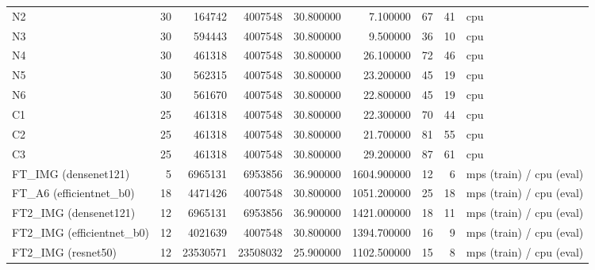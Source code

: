 \begin{table}
\begin{tabular}{lrrrrrrrl}
N2 & 30 & 164742 & 4007548 & 30.800000 & 7.100000 & 67 & 41 & cpu \\
N3 & 30 & 594443 & 4007548 & 30.800000 & 9.500000 & 36 & 10 & cpu \\
N4 & 30 & 461318 & 4007548 & 30.800000 & 26.100000 & 72 & 46 & cpu \\
N5 & 30 & 562315 & 4007548 & 30.800000 & 23.200000 & 45 & 19 & cpu \\
N6 & 30 & 561670 & 4007548 & 30.800000 & 22.800000 & 45 & 19 & cpu \\
C1 & 25 & 461318 & 4007548 & 30.800000 & 22.300000 & 70 & 44 & cpu \\
C2 & 25 & 461318 & 4007548 & 30.800000 & 21.700000 & 81 & 55 & cpu \\
C3 & 25 & 461318 & 4007548 & 30.800000 & 29.200000 & 87 & 61 & cpu \\
FT\_IMG (densenet121) & 5 & 6965131 & 6953856 & 36.900000 & 1604.900000 & 12 & 6 & mps (train) / cpu (eval) \\
FT\_A6 (efficientnet\_b0) & 18 & 4471426 & 4007548 & 30.800000 & 1051.200000 & 25 & 18 & mps (train) / cpu (eval) \\
FT2\_IMG (densenet121) & 12 & 6965131 & 6953856 & 36.900000 & 1421.000000 & 18 & 11 & mps (train) / cpu (eval) \\
FT2\_IMG (efficientnet\_b0) & 12 & 4021639 & 4007548 & 30.800000 & 1394.700000 & 16 & 9 & mps (train) / cpu (eval) \\
FT2\_IMG (resnet50) & 12 & 23530571 & 23508032 & 25.900000 & 1102.500000 & 15 & 8 & mps (train) / cpu (eval) \\
\bottomrule
\end{tabular}
\end{table}
